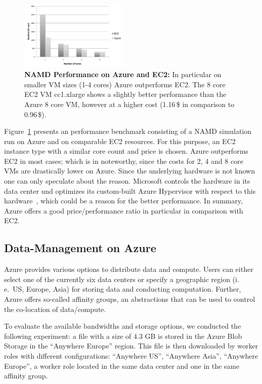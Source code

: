 \documentclass[conference,final]{IEEEtran}
\begin{document}
\begin{figure}[htbp]
    \centering
        \includegraphics[width=0.46\textwidth]{performance/namd_ec2_azure.pdf}
    \caption{\textbf{NAMD Performance on Azure and EC2:} In particular on smaller VM sizes (1-4 cores) Azure 
    outperforms EC2. The 8 core EC2 VM cc1.xlarge shows a slightly better performance than the Azure 8 core VM,
    however at a higher cost (1.16\,\$ in comparison to 0.96\,\$).}
    \label{fig:performance_namd_ec2_azure}
\end{figure}

Figure~\ref{fig:performance_namd_ec2_azure} presents an performance 
benchmark consisting of a NAMD simulation run on Azure and on comparable 
EC2 resources. For this purpose, an EC2 instance type with a similar core
count and price is chosen. Azure outperforms EC2 in most cases;
which is in noteworthy, since the costs for 2, 4 and 8 core VMs are
drastically lower on Azure. Since the underlying hardware is not known
one can only speculate about the reason. Microsoft controls the
hardware in its data center und optimizes its custom-built Azure
Hypervisor with respect to this hardware~\cite{Krishnan:2010nx}, which
could be a reason for the better performance. In summary, Azure offers
a good price/performance ratio in particular in comparison with EC2.

\subsection{Data-Management on Azure}

Azure provides various options to distribute data and
compute. Users can either select one of the currently six data centers or 
specify a geographic region (i.\,e.\ US, Europe, Asia) for storing data and
conducting computation. Further, Azure offers so-called affinity groups, 
an abstractions that can be used to control the co-location of data/compute.

To evaluate the available bandwidths and storage options, we conducted 
the following experiment: a file with a size of 4.3 GB is stored in the Azure Blob Storage in
the ``Anywhere Europe'' region. This file is then downloaded by worker
roles with different configurations: ``Anywhere US'', ``Anywhere
Asia'', ``Anywhere Europe'', a worker role located in the same
data center and one in the same affinity group. 
\end{document}

